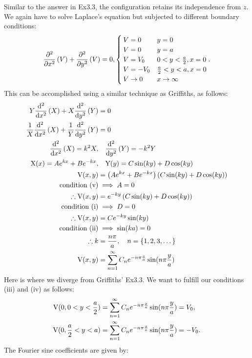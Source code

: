 \begin{hwkProblem}{3.13}{}
	Similar to the answer in Ex3.3, the configuration retains its independence from \( z \). We again have to solve Laplace's equation but subjected to different boundary conditions:
	\[
		\frac{\partial^{2}}{\partial{}{x}^2}\left(V\right) + \frac{\partial^{2}}{\partial{}{y}^2}\left(V\right) = 0,
		\begin{cases}
			V = 0 & y = 0 \\
			V = 0 & y = a \\
			V = V_{0} & 0 < y < \frac{a}{2}, x = 0 \\
			V = -V_{0} & \frac{a}{2} < y < a, x = 0 \\
			V \to 0 & x \to \infty
		\end{cases}
	.\]
	This can be accomplished using a similar technique as Griffiths, as follows:
	\begin{align*}
		Y \derivsec{x}{X} + X \derivsec{y}{Y} &= 0 \\
		\frac{1}{X} \derivsec{x}{X} + \frac{1}{Y} \derivsec{y}{Y} &= 0 \\
		\derivsec{x}{X} = k^{2}X ,& \quad \derivsec{y}{Y} = -k^{2}Y \\
		\func{X}[x] = Ae^{kx}+Be^{-kx} ,& \quad \func{Y}[y] = C \sin{ky} + D \cos{ky} \\
		\func{V}[x, y] &= \left(Ae^{kx}+Be^{-kx}\right) \left(C \sin{ky} + D \cos{ky}\right) \\
		\text{condition (v)} &\implies A = 0 \\
		\therefore \func{V}[x, y] &= e^{-ky} \left(C \sin{ky} + D \cos{ky}\right) \\
		\text{condition (i)} &\implies D = 0 \\
		\therefore \func{V}[x, y] &= C e^{-ky} \sin{ky} \\
		\text{condition (ii)} &\implies \sin{ka} = 0 \\
		\therefore k &= \frac{n\pi}{a}, \quad n = \left\{1, 2, 3, \dots\right\} \\
		\func{V}[x, y] &= \sum_{n=1}^{\infty}C_{n}e^{-n \pi \frac{x}{a}} \sin{n \pi \frac{y}{a}}
	\end{align*}
	Here is where we diverge from Griffiths' Ex3.3. We want to fulfill our conditions (iii) and (iv) as follows:
	\begin{align*}
		\func{V}[0, 0<y<\frac{a}{2}] &= \sum_{n=1}^{\infty}C_{n}e^{-n \pi \frac{x}{a}} \sin{n \pi \frac{y}{a}} = V_{0}, \\
		\func{V}[0, \frac{a}{2}<y<a] &= \sum_{n=1}^{\infty}C_{n}e^{-n \pi \frac{x}{a}} \sin{n \pi \frac{y}{a}} = -V_{0}.
	\end{align*}
	The Fourier sine coefficients are given by:

\end{hwkProblem}
